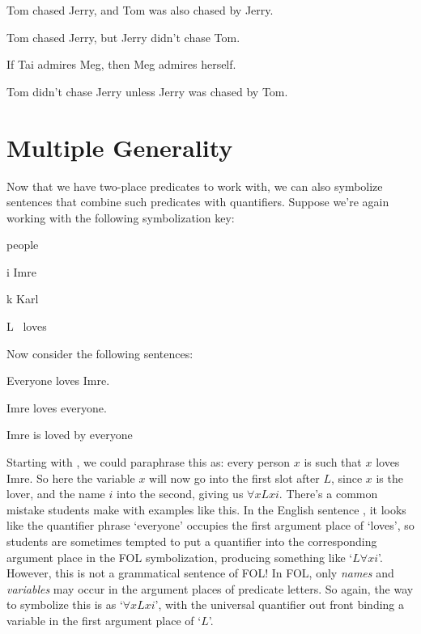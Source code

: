 \begin{earg}
\item Tom chased Jerry, and Tom was also chased by Jerry.
\item Tom chased Jerry, but Jerry didn't chase Tom.
\item If Tai admires Meg, then Meg admires herself.
\item Tom didn't chase Jerry unless Jerry was chased by Tom.
\end{earg}


\section{Multiple Generality}

Now that we have two-place predicates to work with, we can also symbolize sentences that combine such predicates with quantifiers.  Suppose we're again working with the following symbolization key:
	\begin{ekey}
		\item[\text{domain}] people
		\item[i] Imre
		\item[k] Karl
		\item[L] \blank\ loves \blank
	\end{ekey}
Now consider the following sentences:
	\begin{earg}
		\item[\ex{elovi}] Everyone loves Imre.
		\item[\ex{ilove}] Imre loves everyone.
		\item[\ex{ilovep}] Imre is loved by everyone
	\end{earg}
Starting with , we could paraphrase this as: every person $x$ is such that $x$ loves Imre.  So here the variable $x$ will now go into the first slot after $L$, since $x$ is the lover, and the name $i$ into the second, giving us $\forall xLxi$.  There's a common mistake students make with examples like this.  In the English sentence , it looks like the quantifier phrase `everyone'  occupies the first argument place of `loves', so students are sometimes tempted to put a quantifier into the corresponding argument place in the FOL symbolization, producing something like `$L\forall xi$'.  However, this is not a grammatical sentence of FOL!  In FOL, only \emph{names} and \emph{variables} may occur in the argument places of predicate letters.  So again, the way to symbolize this is as `$\forall xLxi$', with the universal quantifier out front binding a variable in the first argument place of `$L$'.

